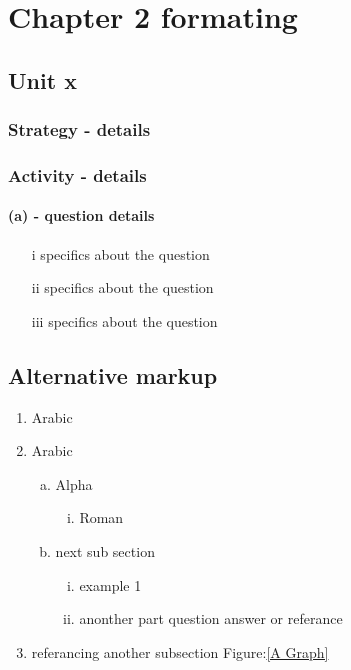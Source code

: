 \documentclass{report}
\begin{document}
\chapter{Chapter 2 formating}
\section{Unit x}

\subsection{Strategy - details}

\subsection{Activity - details}

\subsubsection{(a) - question details}

\begin{itemize}
\item[i] specifics about the question
\item[ii] specifics about the question
\item[iii] specifics about the question
\end{itemize}
\clearpage

\section{Alternative markup} %

\begin{enumerate}
	\item Arabic
	\item Arabic
	\begin{enumerate}[(a)]%
		\item Alpha
			\begin{enumerate}[(i)]
				\item Roman
			\end{enumerate}
		\item next sub section
			\begin{enumerate}[(i)]
				\item example 1
				\item anonther part question answer or referance
			\end{enumerate}	
	\end{enumerate}
	\item referancing another subsection Figure:\ref{A Graph}
\end{enumerate}
\end{document}
